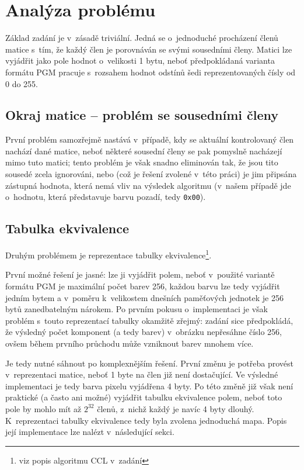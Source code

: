 \section{Analýza problému}

Základ zadání je v~zásadě triviální. Jedná se o~jednoduché procházení členů matice s~tím, že každý člen je porovnáván
se svými sousedními členy. Matici lze vyjádřit jako pole hodnot o~velikosti 1 bytu, neboť předpokládaná varianta formátu
PGM pracuje s~rozsahem hodnot odstínů šedi reprezentovaných čísly od 0 do 255.

\subsection[Okraj matice]{Okraj matice -- problém se sousedními členy}
První problém samozřejmě nastává v~případě, kdy se aktuální kontrolovaný člen nachází
 dané matice, neboť některé sousední členy se pak pomyslně nacházejí mimo tuto matici; tento problém je
však snadno eliminován tak, že jsou tito sousedé zcela ignorováni, nebo (což je řešení zvolené v~této práci) je jim
připsána zástupná hodnota, která nemá vliv na výsledek algoritmu (v~našem případě jde o~hodnotu, která představuje barvu
pozadí, tedy \verb|0x00|).

\subsection{Tabulka ekvivalence}
Druhým problémem je reprezentace tabulky ekvivalence\footnote{viz popis algoritmu CCL v~zadání}.

První možné řešení je jasné: lze ji vyjádřit polem, neboť v~použité variantě formátu PGM je maximální počet barev 256,
každou barvu lze tedy vyjádřit jedním bytem a v~poměru k~velikostem dnešních paměťových jednotek je 256 bytů
zanedbatelným nárokem. Po prvním pokusu o~implementaci je však problém s~touto reprezentací tabulky okamžitě zřejmý:
zadání sice předpokládá, že výsledný počet komponent (a tedy barev) v~obrázku nepřesáhne číslo 256, ovšem během prvního
průchodu může vzniknout barev mnohem více.

Je tedy nutné sáhnout po komplexnějším řešení. První změnu je potřeba provést v~reprezentaci matice, neboť 1 byte
na člen již není dostačující. Ve výsledné implementaci je tedy barva pixelu vyjádřena 4 byty. Po této změně již však
není praktické (a často ani možné) vyjádřit tabulku ekvivalence polem, neboť toto pole by mohlo mít až $ 2^{32} $ členů,
z~nichž každý je navíc 4 byty dlouhý. K~reprezentaci tabulky ekvivalence tedy byla zvolena jednoduchá mapa. Popis její
implementace lze nalézt v~následující sekci.
